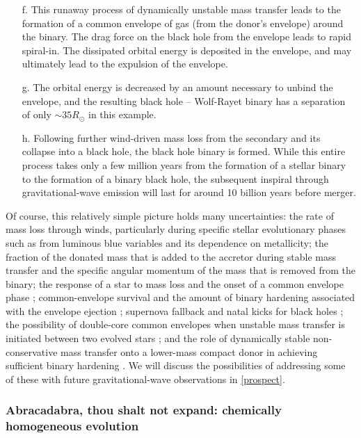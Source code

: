 \documentclass[iop,onecolumn]{revtex4-1}
\begin{document}
\begin{enumerate}
\item[f.] This runaway process of dynamically unstable mass transfer leads to the formation of a common envelope of gas (from the donor's envelope) around the binary.  The drag force on the black hole from the envelope leads to rapid spiral-in.   The dissipated orbital energy is deposited in the envelope, and may ultimately lead to the expulsion of the envelope.  
\item[g.] The orbital energy is decreased by an amount necessary to unbind the envelope, and the resulting black hole -- Wolf-Rayet binary has a separation of only $\sim 35 R_\odot$ in this example.  
\item[h.] Following further wind-driven mass loss from the secondary and its collapse into a black hole, the black hole binary is formed.  While this entire process takes only a few million years from the formation of a stellar binary to the formation of a binary black hole, the subsequent inspiral through gravitational-wave emission will last for around 10 billion years before merger.
\end{enumerate}

Of course, this relatively simple picture holds many uncertainties: the rate of mass loss through winds, particularly during specific stellar evolutionary phases such as from luminous blue variables \citep[massive supergiant stars with significant outbursts and eruptions and associated rapid mass loss,][]{Mennekens:2014}  and its dependence on metallicity; the fraction of the donated mass that is added to the accretor during stable mass transfer and the specific angular momentum of the mass that is removed from the binary; the response of a star to mass loss and the onset of a common envelope phase \citep{Pavlovskii:2017}; common-envelope survival and the amount of binary hardening associated with the envelope ejection \citep[e.g.,][]{Kruckow:2016}; supernova fallback and natal kicks for black holes \citep[e.g.,][]{Repetto:2012,Mandel:2015kicks}; the possibility of double-core common envelopes when unstable mass transfer is initiated between two evolved stars \citep{BetheBrown:1998,Dewi:2006}; and the role of dynamically stable non-conservative mass transfer onto a lower-mass compact donor in achieving sufficient binary hardening  \citep{vandenHeuvel:2017,Neijssel:2018}.  We will discuss the possibilities of addressing some of these with future gravitational-wave observations in \autoref{prospect}.

\subsubsection{Abracadabra, thou shalt not expand: chemically homogeneous evolution}\label{sec:CHE}
\end{document}
